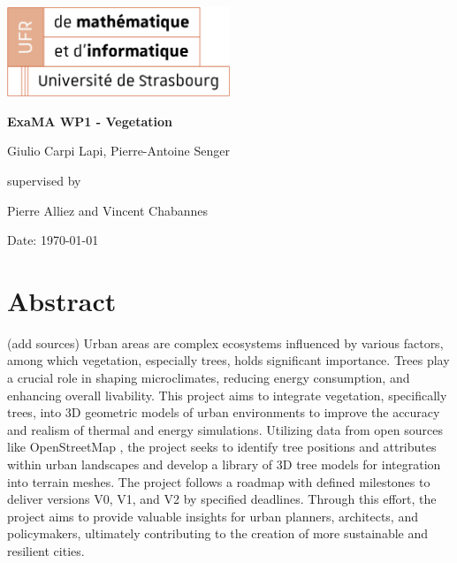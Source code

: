 \documentclass[12pt]{article}
\begin{document}
\begin{titlepage}
\centering
\includegraphics[width=0.5\textwidth]{images/logo_ufr.png}\par\vspace{1cm}
\vspace{1.5cm}
{\huge\bfseries ExaMA WP1 - Vegetation\par}
\vspace{2cm}
{\Large Giulio Carpi Lapi, Pierre-Antoine Senger\par}
\vfill
supervised by\par
Pierre Alliez and Vincent Chabannes

\vfill

{\large Date: \today\par}
\end{titlepage}

\tableofcontents
\newpage

\section{Abstract}
(add sources)
Urban areas are complex ecosystems influenced by various factors, among which 
vegetation, especially trees, holds significant importance. Trees play a crucial 
role in shaping microclimates, reducing energy consumption, and enhancing overall 
livability. This project aims to integrate vegetation, specifically trees, into 3D 
geometric models of urban environments to improve the accuracy and realism of thermal 
and energy simulations. Utilizing data from open sources like OpenStreetMap , the project 
seeks to identify tree positions and attributes within urban landscapes and develop 
a library of 3D tree models for integration into terrain meshes. The project follows
 a roadmap with defined milestones to deliver versions V0, V1, and V2 by specified 
 deadlines. Through this effort, the project aims to provide valuable insights for
  urban planners, architects, and policymakers, ultimately contributing to the
   creation of more sustainable and resilient cities.
\end{document}
